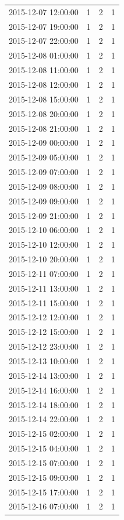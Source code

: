 \begin{tabular}{lrrr}
2015-12-07 12:00:00 & 1 & 2 & 1 \\
2015-12-07 19:00:00 & 1 & 2 & 1 \\
2015-12-07 22:00:00 & 1 & 2 & 1 \\
2015-12-08 01:00:00 & 1 & 2 & 1 \\
2015-12-08 11:00:00 & 1 & 2 & 1 \\
2015-12-08 12:00:00 & 1 & 2 & 1 \\
2015-12-08 15:00:00 & 1 & 2 & 1 \\
2015-12-08 20:00:00 & 1 & 2 & 1 \\
2015-12-08 21:00:00 & 1 & 2 & 1 \\
2015-12-09 00:00:00 & 1 & 2 & 1 \\
2015-12-09 05:00:00 & 1 & 2 & 1 \\
2015-12-09 07:00:00 & 1 & 2 & 1 \\
2015-12-09 08:00:00 & 1 & 2 & 1 \\
2015-12-09 09:00:00 & 1 & 2 & 1 \\
2015-12-09 21:00:00 & 1 & 2 & 1 \\
2015-12-10 06:00:00 & 1 & 2 & 1 \\
2015-12-10 12:00:00 & 1 & 2 & 1 \\
2015-12-10 20:00:00 & 1 & 2 & 1 \\
2015-12-11 07:00:00 & 1 & 2 & 1 \\
2015-12-11 13:00:00 & 1 & 2 & 1 \\
2015-12-11 15:00:00 & 1 & 2 & 1 \\
2015-12-12 12:00:00 & 1 & 2 & 1 \\
2015-12-12 15:00:00 & 1 & 2 & 1 \\
2015-12-12 23:00:00 & 1 & 2 & 1 \\
2015-12-13 10:00:00 & 1 & 2 & 1 \\
2015-12-14 13:00:00 & 1 & 2 & 1 \\
2015-12-14 16:00:00 & 1 & 2 & 1 \\
2015-12-14 18:00:00 & 1 & 2 & 1 \\
2015-12-14 22:00:00 & 1 & 2 & 1 \\
2015-12-15 02:00:00 & 1 & 2 & 1 \\
2015-12-15 04:00:00 & 1 & 2 & 1 \\
2015-12-15 07:00:00 & 1 & 2 & 1 \\
2015-12-15 09:00:00 & 1 & 2 & 1 \\
2015-12-15 17:00:00 & 1 & 2 & 1 \\
2015-12-16 07:00:00 & 1 & 2 & 1 \\

\end{tabular}
